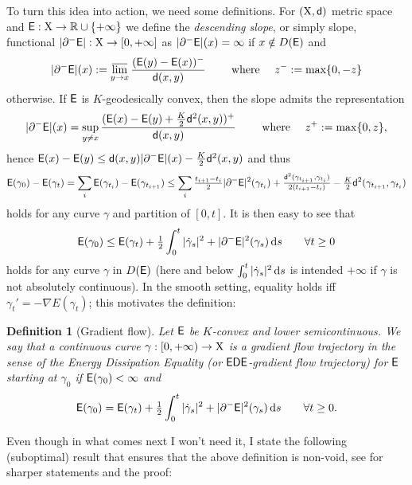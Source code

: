 \documentclass[11pt]{article}
\numberwithin{equation}{section}
\newtheorem{definition}[theorem]{Definition}
\newcommand{\R}{\mathbb{R}}
\newcommand{\X}{{\rm X}}
\newcommand{\sfd}{{\sf d}}
\renewcommand{\d}{{\rm d}}
\newcommand{\lims}{\varlimsup}
\newcommand{\E}{{\sf E}} %
\newcommand{\EDE}{{\sf EDE}}
\begin{document}
To turn this idea into action, we need some definitions. For $(\X,\sfd)$ metric space and $\E:\X\to\R\cup\{+\infty\}$ we define   the \emph{descending slope}, or simply slope, functional $|\partial^-\E|:\X\to[0,+\infty]$ as  $|\partial^-\E|(x)=\infty$ if $x\notin D(\E)$ and
\begin{equation}
\label{eq:defsl}
|\partial^-\E|(x):=\lims_{y\to x}\frac{(\E(y)-\E(x))^-}{\sfd(x,y)}\qquad\text{ where }\quad z^-:=\max\{0,-z\}
\end{equation}
otherwise. If $\E$ is $K$-geodesically convex, then the slope admits the representation
\begin{equation}
\label{eq:reprsl}
|\partial^-\E|(x)=\sup_{y\neq x}\frac{(\E(x)-\E(y)+\tfrac K2\sfd^2(x,y))^+}{\sfd(x,y)}\qquad\text{ where }\quad z^+:=\max\{0,z\},
\end{equation}
hence $\E(x)-\E(y)\leq\sfd(x,y)|\partial^-\E|(x)-\tfrac K2\sfd^2(x,y)$ and thus
\[
\E(\gamma_0)-\E(\gamma_t)=\sum_i\E(\gamma_{t_i})-\E(\gamma_{t_{i+1}})\leq\sum_i\tfrac{t_{i+1}-t_i}2|\partial^-\E|^2(\gamma_{t_i})+\tfrac{\sfd^2(\gamma_{t_{i+1}},\gamma_{t_i})}{2(t_{i+1}-t_i)}-\tfrac K2\sfd^2(\gamma_{t_{i+1}},\gamma_{t_i})
\]
holds for any curve $\gamma$ and partition of $[0,t]$. It is then easy to see that
\begin{equation}
\label{eq:uppgr}
\E(\gamma_0)\leq\E(\gamma_t)+\tfrac12\int_0^t|\dot\gamma_s|^2+|\partial^-\E|^2(\gamma_s)\,\d s\qquad\forall t\geq 0
\end{equation}
holds for any  curve $\gamma$ in $D(\E)$ (here and below $\int_0^t|\dot\gamma_s|^2\,\d s$ is intended $+\infty$ if $\gamma$ is not absolutely continuous). In the smooth setting, equality holds   iff $\gamma_t'=-\nabla E(\gamma_t)$; this motivates the definition:
\begin{definition}[Gradient flow]\label{def:gfede}
Let $\E$ be $K$-convex and lower semicontinuous. We say that a continuous curve $\gamma:[0,+\infty)\to\X$ is a gradient flow trajectory in the sense of the Energy Dissipation Equality (or $\EDE$-gradient flow trajectory) for $\E$ starting at $\gamma_0$ if   $\E(\gamma_0)<\infty$ and
\begin{equation}
\label{eq:defgf}
\E(\gamma_0)=\E(\gamma_t)+\tfrac12\int_0^t|\dot\gamma_s|^2+|\partial^-\E|^2(\gamma_s)\,\d s\qquad\forall t\geq 0.
\end{equation}
\end{definition}
Even though in what comes next I won't need it, I  state the following (suboptimal) result that ensures that the above definition is non-void, see \cite[Section 2.4]{AmbrosioGigliSavare08} for sharper statements and the proof:
\end{document}
